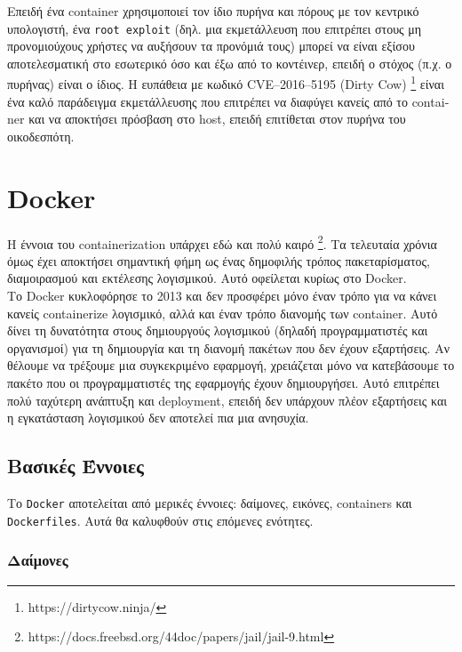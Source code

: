 Επειδή ένα \textlatin{container} χρησιμοποιεί τον ίδιο πυρήνα και πόρους με
τον κεντρικό υπολογιστή, ένα
\texttt{root exploit} (δηλ. μια εκμετάλλευση που επιτρέπει στους μη
προνομιούχους χρήστες να αυξήσουν τα προνόμιά τους) μπορεί να είναι εξίσου
αποτελεσματική στο εσωτερικό όσο και έξω από το κοντέινερ, επειδή
ο στόχος (π.χ. ο πυρήνας) είναι ο ίδιος. Η ευπάθεια με κωδικό
\textlatin{CVE–2016–5195 (Dirty Cow)}
\footnote{\textlatin{https://dirtycow.ninja/}} είναι ένα καλό παράδειγμα εκμετάλλευσης που επιτρέπει
να διαφύγει κανείς από το \textlatin{container} και να αποκτήσει πρόσβαση στο
\textlatin{host}, επειδή επιτίθεται στον πυρήνα του οικοδεσπότη.
\cite{Dirty-Cow-Escape}


\section{\textlatin{Docker}}

Η έννοια του \textlatin{containerization} υπάρχει εδώ και πολύ καιρό
\footnote{\textlatin{https://docs.freebsd.org/44doc/papers/jail/jail-9.html}}.
Τα τελευταία χρόνια όμως έχει αποκτήσει σημαντική φήμη ως ένας δημοφιλής τρόπος
πακεταρίσματος, διαμοιρασμού και εκτέλεσης λογισμικού. Αυτό οφείλεται κυρίως
στο \textlatin{Docker}. \cite{Docker-Popular} \\

Το \textlatin{Docker} κυκλοφόρησε το 2013 και δεν προσφέρει μόνο έναν τρόπο
για να κάνει κανείς \textlatin{containerize} λογισμικό, αλλά και έναν τρόπο
διανομής των \textlatin{container}. Αυτό δίνει τη δυνατότητα στους δημιουργούς
λογισμικού
(δηλαδή προγραμματιστές και οργανισμοί) για τη δημιουργία και τη διανομή πακέτων
που δεν έχουν εξαρτήσεις. Αν θέλουμε να τρέξουμε μια συγκεκριμένο εφαρμογή,
χρειάζεται μόνο να κατεβάσουμε το πακέτο που οι προγραμματιστές της
εφαρμογής έχουν δημιουργήσει. Αυτό επιτρέπει πολύ ταχύτερη ανάπτυξη και
\textlatin{deployment}, επειδή δεν υπάρχουν πλέον εξαρτήσεις και η εγκατάσταση
λογισμικού δεν αποτελεί πια μια ανησυχία.


\subsection{Βασικές Έννοιες}

Το \texttt{\textlatin{Docker}} αποτελείται από μερικές έννοιες: δαίμονες,
εικόνες, \textlatin{containers} και \texttt{\textlatin{Dockerfiles}}. Αυτά θα
καλυφθούν στις επόμενες ενότητες.

\subsubsection{Δαίμονες}

